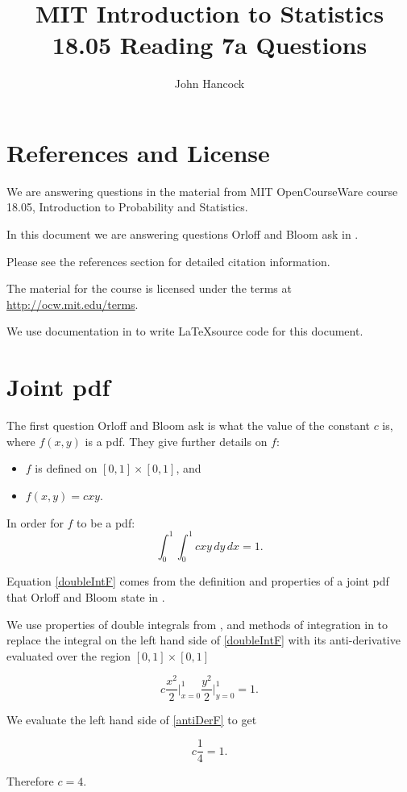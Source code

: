 \documentclass[a4paper,11pt]{article}
\author{John Hancock}
\title{MIT Introduction to Statistics 18.05 Reading 7a Questions}
\begin{document}
\maketitle
\tableofcontents
\section{References and License}
We are answering questions in the material from MIT OpenCourseWare
course 18.05, Introduction to Probability and Statistics.

In this document we are answering questions Orloff and Bloom ask in
\cite{reading7qu}.

Please see the references section for detailed citation information.

The material for the course is licensed under the terms at
\url{http://ocw.mit.edu/terms}.

We use documentation in  to write \LaTeX source code for this
document.

\section{Joint pdf}
The first question Orloff and Bloom ask is what the value of the constant
$c$ is, where $f\left(x, y\right)$ is a pdf.  They give further details
on $f$:
\begin{itemize}
  \item $f$ is defined on $\left[0,1 \right] \times \left[0, 1 \right]$, and
  \item $f \left( x, y \right) = cxy$.
\end{itemize}

In order for $f$ to be a pdf:
\begin{equation}\label{doubleIntF}
  \int_{0}^{1} \int_{0}^{1} cxy \, dy \, dx = 1.
\end{equation}

Equation \ref{doubleIntF} comes from the definition and properties
of a joint pdf that Orloff and Bloom state in \cite{reading7}.

We use properties of double integrals from \cite{doubleIntProp}, and
methods of integration in \cite{doubleIntEval} to replace the
integral on the left hand side of \ref{doubleIntF} with its
anti-derivative evaluated over the region
$\left[ 0, 1 \right] \times \left[ 0, 1 \right]$

\begin{equation}\label{antiDerF}
  c \frac{x^2}{2} \bigg\rvert_{x=0}^1 \frac{y^2}{2} \bigg\rvert_{y=0}^1 = 1.
\end{equation}

We evaluate the left hand side of  \ref{antiDerF} to get

\begin{equation}\label{antiDerF}
  c \frac{1}{4}  = 1.
\end{equation}

Therefore $c=4$.


\printbibliography{}
\end{document}
